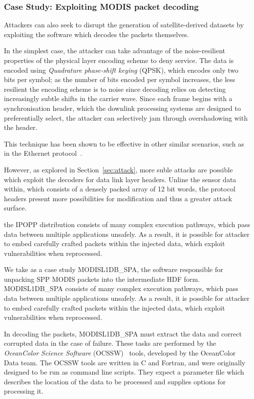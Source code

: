 
\subsubsection{Case Study: Exploiting MODIS packet decoding}

Attackers can also seek to disrupt the generation of satellite-derived datasets by exploiting the software which decodes the packets themselves.

In the simplest case, the attacker can take advantage of the noise-resilient properties of the physical layer encoding scheme to deny service.
The data is encoded using \textit{Quadrature phase-shift keying} (QPSK), which encodes only two bits per symbol; as the number of bits encoded per symbol increases, the less resilient the encoding scheme is to noise since decoding relies on detecting increasingly subtle shifts in the carrier wave.
Since each frame begins with a synchronisation header, which the downlink processing systems are designed to preferentially select, the attacker can selectively jam through overshadowing with the header.

This technique has been shown to be effective in other similar scenarios, such as in the Ethernet protocol~\cite{}.


However, as explored in Section~\ref{sec:attack}, more suble attacks are possible which exploit the decoders for data link layer headers.
Unline the sensor data within, which consists of a densely packed array of 12 bit words, the protocol headers present more possibilities for modification and thus a greater attack surface.

the IPOPP distribution consists of many complex execution pathways, which pass data between multiple applications unsafely.
As a result, it is possible for attacker to embed carefully crafted packets within the injected data, which exploit vulnerabilities when reprocessed.

We take as a case study MODISL1DB\_SPA, the software responsible for unpacking SPP MODIS packets into the intermediate HDF form.
MODISL1DB\_SPA consists of many complex execution pathways, which pass data between multiple applications unsafely.
As a result, it is possible for attacker to embed carefully crafted packets within the injected data, which exploit vulnerabilities when reprocessed.

In decoding the packets, MODISL1DB\_SPA must extract the data and correct corrupted data in the case of failure.
These tasks are performed by the \textit{OceanColor Science Software} (OCSSW)~\cite{ocssw} tools, developed by the OceanColor Data team.
The OCSSW tools are written in C and Fortran, and were originally designed to be run as command line scripts.
They expect a parameter file which describes the location of the data to be processed and supplies options for processing it.

